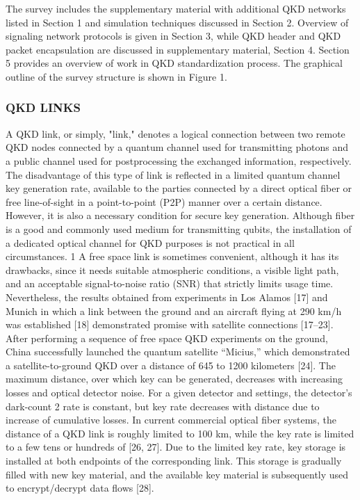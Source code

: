 The survey includes the supplementary material with additional QKD networks listed in Section 1 and simulation techniques discussed in Section 2. Overview of signaling network protocols is given in Section 3, while QKD header and QKD packet encapsulation are discussed in supplementary material, Section 4. Section 5 provides an overview of work in QKD standardization process.
The graphical outline of the survey structure is shown in Figure 1.
\subsubsection{QKD LINKS}
A QKD link, or simply, "link," denotes a logical connection between two remote QKD nodes connected by a quantum channel used for transmitting photons and a public channel used for postprocessing the exchanged information, respectively. The disadvantage of this type of link is reflected in a limited quantum channel key generation rate, available to the parties connected by a direct optical fiber or free line-of-sight in a point-to-point (P2P) manner over a certain distance.
However, it is also a necessary condition for secure key generation.
Although fiber is a good and commonly used medium for transmitting qubits, the installation of a dedicated optical channel for QKD purposes is not practical in all circumstances. 1 A free space link is sometimes convenient, although it has its drawbacks, since it needs suitable atmospheric conditions, a visible light path, and an acceptable signal-to-noise ratio (SNR) that strictly limits usage time. Nevertheless, the results obtained from experiments in Los Alamos [17] and Munich in which a link between the ground and an aircraft flying at 290 km/h was established [18] demonstrated promise with satellite connections [17–23]. After performing a sequence of free space QKD experiments on the ground, China successfully launched the quantum satellite “Micius,” which demonstrated a satellite-to-ground QKD over a distance of 645 to 1200 kilometers [24].
The maximum distance, over which key can be generated, decreases with increasing losses and optical detector noise. For a given detector and settings, the detector’s dark-count 2 rate is constant, but key rate decreases with distance due to increase of cumulative losses. In current commercial optical fiber systems, the distance of a QKD link is roughly limited to 100 km, while the key rate is limited to a few tens or hundreds of [26, 27]. Due to the limited key rate, key storage is installed at both endpoints of the corresponding link. This storage is gradually filled with new key material, and the available key material is subsequently used to encrypt/decrypt data flows [28].

